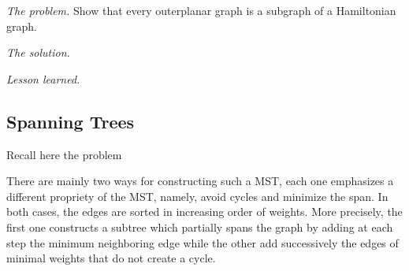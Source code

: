 \medskip

\noindent \textit{The problem.}
Show that every outerplanar graph is a subgraph of a Hamiltonian graph.
\medskip

\noindent \textit{The solution.}

\medskip

\noindent \textit{Lesson learned.}



\subsection{Spanning Trees}
\label{Exercice:spanningTrees}

%
Recall here the problem
\medskip

There are mainly two ways for constructing such a MST, each one
emphasizes a different propriety of the MST, namely, avoid cycles and
minimize the span.  In both cases, the edges are sorted in increasing
order of weights.  More precisely, the first one constructs a subtree
which partially spans the graph by adding at each step the minimum
neighboring edge while the other add successively the edges of minimal
weights that do not create a cycle.



